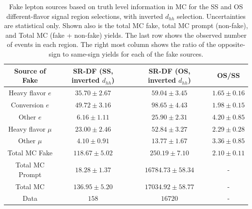 \begin{table}[!htb]
    \begin{center}
    \caption{
        Fake lepton sources based on truth level information in MC for the SS and OS different-flavor signal region selections,
        with inverted $d_{hh}$ selection. Uncertainties are statistical only.
        Shown also is the
        total MC fake, total MC prompt (non-fake), and Total MC (fake + non-fake) yields. The last row
        shows the observed number of events in each region. The right most column shows the
        ratio of the opposite-sign to same-sign yields for each of the fake sources.
    }
    \label{tab:fake_composition_srdf}
    \begin{tabular}{c | c c | c} %
    \hline
    \textbf{Source of Fake} & \textbf{SR-DF (SS, inverted $d_{hh}$)} & \textbf{SR-DF (OS, inverted $d_{hh}$)} & \textbf{OS/SS} \\
    \hline
    Heavy flavor $e$ & $35.70 \pm 2.67$ & $59.04 \pm 3.45$ & $1.65 \pm 0.16$ \\
    Conversion $e$ & $49.72 \pm 3.16$ & $98.65 \pm 4.43$ & $1.98 \pm 0.15$ \\
    Other $e$ & $6.16 \pm 1.11$ & $25.90 \pm 2.31$ & $4.20 \pm 0.85$ \\
    Heavy flavor $\mu$ & $23.00 \pm 2.46$ & $52.84 \pm 3.27$ & $2.29 \pm 0.28$ \\
    Other $\mu$ & $4.10 \pm 0.91$ & $13.77 \pm 1.67$ & $3.36 \pm 0.85$ \\
    \hdashline
    Total MC Fake & $118.67 \pm 5.02$ & $250.19 \pm 7.10$ & $2.10 \pm 0.11$ \\
    Total MC Prompt & $18.28 \pm 1.37$ & $16784.73 \pm 58.34$ & -\\
    \hline
    Total MC & $136.95 \pm 5.20$ & $17034.92 \pm 58.77$ & - \\
    Data & $158$ & $16720$ & - \\
    \hline
    \end{tabular}
    \end{center}
\end{table}

